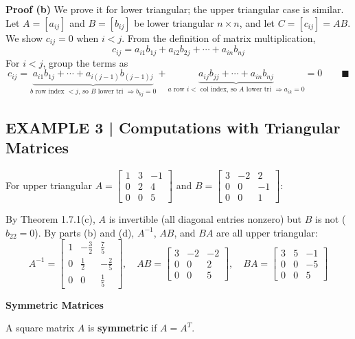 \documentclass{article}
\newcommand{\redheading}[1]{{\vspace{2mm}\noindent\Large\bfseries\color{red!55!black} #1\par}\vspace{2mm}}
\theoremstyle{mystyle}
\begin{document}
\textbf{Proof (b)} We prove it for lower triangular; the upper triangular case is similar. Let $A=[a_{ij}]$ and $B=[b_{ij}]$ be lower triangular $n\times n$, and let $C=[c_{ij}]=AB$. We show $c_{ij}=0$ when $i<j$. From the definition of matrix multiplication,
\[
c_{ij}=a_{i1}b_{1j}+a_{i2}b_{2j}+\cdots+a_{in}b_{nj}
\]
For $i<j$, group the terms as
\[
c_{ij}=\underbrace{a_{i1}b_{1j}+\cdots+a_{i(j-1)}b_{(j-1)j}}_{\text{$b$ row index $<j$, so $B$ lower tri } \Rightarrow b_{kj}=0}+\underbrace{a_{ij}b_{jj}+\cdots+a_{in}b_{nj}}_{\text{$a$ row $i<$ col index, so $A$ lower tri }\Rightarrow a_{ik}=0}=0 \qquad\blacksquare
\]

\subsection*{EXAMPLE 3 | Computations with Triangular Matrices}
For upper triangular $A=\begin{bmatrix}1&3&-1\\0&2&4\\0&0&5\end{bmatrix}$ and $B=\begin{bmatrix}3&-2&2\\0&0&-1\\0&0&1\end{bmatrix}$:

By Theorem 1.7.1(c), $A$ is invertible (all diagonal entries nonzero) but $B$ is not ($b_{22}=0$). By parts (b) and (d), $A^{-1}$, $AB$, and $BA$ are all upper triangular:
\[
A^{-1}=\begin{bmatrix}1&-\frac{3}{2}&\frac{7}{5}\\0&\frac{1}{2}&-\frac{2}{5}\\0&0&\frac{1}{5}\end{bmatrix},\quad
AB=\begin{bmatrix}3&-2&-2\\0&0&2\\0&0&5\end{bmatrix},\quad
BA=\begin{bmatrix}3&5&-1\\0&0&-5\\0&0&5\end{bmatrix}
\]

\redheading{Symmetric Matrices}

\begin{tcolorbox}[colback=teal!4, colframe=teal!65!black, title=Definition 1, fonttitle=\bfseries, boxrule=0.5mm, arc=3mm]
A square matrix $A$ is \textbf{symmetric} if $A=A^T$.
\end{tcolorbox}
\end{document}

